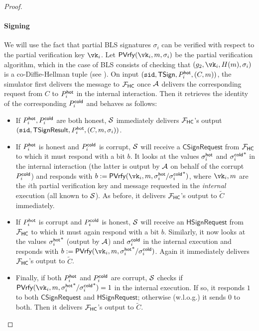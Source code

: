 \begin{proof}
\paragraph{Signing} 
We will use the fact that partial BLS signatures $\sigma_i$ can be verified with respect to the partial verification key $\vk_i$. Let $\mathsf{P}\vrfy(\vk_i, m, \sigma_i)$ be the partial verification algorithm, which in the case of BLS consists of checking that $(g_2, \vk_i, \blshash(m), \sigma_i)$ is a co-Diffie-Hellman tuple (see ).
On input $(\texttt{sid}, \mathsf{TSign}, P_i^{\mathsf{hot}}, (C, m))$, the simulator first delivers the message to $\mathcal{F}_\mathsf{HC}$ once $\mathcal{A}$ delivers the corresponding request from $C$ to $P_i^{\mathsf{hot}}$ in the internal interaction. Then it retrieves the identity of the corresponding $P_i^{\mathsf{cold}}$ and behaves as follows:
\begin{itemize}
    \item If $P_i^{\mathsf{hot}}, P_i^{\mathsf{cold}}$ are both honest, $\mathcal{S}$ immediately delivers $\mathcal{F}_\mathsf{HC}$'s output $(\texttt{sid},\allowbreak \mathsf{TSignResult}, P_i^{\mathsf{hot}}, (C, m, \sigma_i))$.
    \item If $P_i^{\mathsf{hot}}$ is honest and $P_i^{\mathsf{cold}}$ is corrupt, $\mathcal{S}$ will receive a $\mathsf{CSignRequest}$ from $\mathcal{F}_\mathsf{HC}$ to which it must respond with a bit $b$. It looks at the values $\sigma_i^{\mathsf{hot}}$ and ${\sigma_i^{\mathsf{cold}}}^*$ in the internal interaction (the latter is output by $\mathcal{A}$ on behalf of the corrupt $P_i^{\mathsf{cold}}$) and responds with $b := \mathsf{P}\vrfy(\vk_i, m, \sigma_i^\hot/{\sigma_i^\cold}^*)$, where $\vk_i, m$ are the $i$th partial verification key and message requested in the \emph{internal} execution (all known to $\mathcal{S}$). As before, it delivers $\mathcal{F}_\mathsf{HC}$'s output to $\tilde{C}$ immediately.
    \item If $P_i^{\mathsf{hot}}$ is corrupt and $P_i^{\mathsf{cold}}$ is honest, $\mathcal{S}$ will receive an $\mathsf{HSignRequest}$ from $\mathcal{F}_\mathsf{HC}$ to which it must again respond with a bit $b$. Similarly, it now looks at the values ${\sigma_i^{\mathsf{hot}}}^*$ (output by $\mathcal{A}$) and $\sigma_i^{\mathsf{cold}}$ in the internal execution and responds with $b := \mathsf{P}\vrfy(\vk_i, m, {\sigma_i^\hot}^*/\sigma_i^\cold)$. Again it immediately delivers $\mathcal{F}_\mathsf{HC}$'s output to $\tilde{C}$.
    \item Finally, if both $P_i^{\mathsf{hot}}$ and $P_i^{\mathsf{cold}}$ are corrupt, $\mathcal{S}$ checks if $\mathsf{P}\vrfy(\vk_i, m, {\sigma_i^\hot}^*/{\sigma_i^\cold}^*) = 1$ in the internal execution. If so, it responds $1$ to both $\mathsf{CSignRequest}$ and $\mathsf{HSignRequest}$; otherwise (w.l.o.g.) it sends $0$ to both. Then it delivers $\mathcal{F}_\mathsf{HC}$'s output  to $\tilde{C}$.
\end{itemize}


\end{proof}
